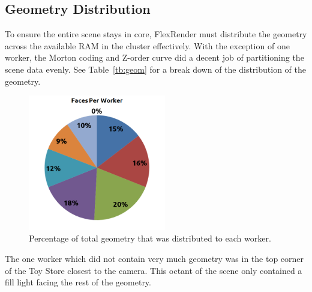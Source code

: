 \documentclass[a4paper,twoside]{article}
\begin{document}

\subsection{Geometry Distribution}
\label{geomdist}

To ensure the entire scene stays in core, FlexRender must distribute the
geometry across the available RAM in the cluster effectively. With the exception
of one worker, the Morton coding and Z-order curve did a decent job of
partitioning the scene data evenly. See Table~\ref{tb:geom} for a break down of the 
distribution of the geometry.

\begin{figure}[h!]
    \centering
    \includegraphics[width=60mm]{figures/facesperworker.png}
    \caption{Percentage of total geometry that was distributed to each worker.}
    \label{fig:geomdist}
\end{figure}

The one worker which did not contain very much geometry was in the top corner
of the Toy Store closest to the camera. This octant of the scene only contained
a fill light facing the rest of the geometry.

\end{document}
